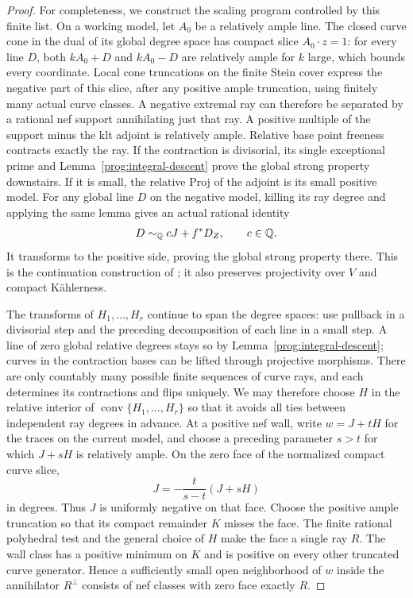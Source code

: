 \begin{proof}
For completeness, we construct the scaling program controlled by this
finite list. On a working model, let \(A_0\) be a relatively ample line.
The closed curve cone in the dual of its global degree space has compact
slice \(A_0\cdot z=1\): for every line \(D\), both \(kA_0+D\) and \(kA_0-D\)
are relatively ample for \(k\) large, which bounds every coordinate.
Local cone truncations on the finite Stein cover express the negative
part of this slice, after any positive ample truncation, using
finitely many actual curve classes.  A negative extremal ray can
therefore be separated by a rational nef support annihilating just
that ray.  A positive multiple of the support minus the klt adjoint
is relatively ample.  Relative base point freeness contracts exactly
the ray.  If the contraction is divisorial, its single exceptional
prime and Lemma~\ref{prog:integral-descent} prove the global strong
property downstairs.  If it is small, the relative Proj of the
adjoint is its small positive model.  For any global line \(D\) on
the negative model, killing its ray degree and applying the same
lemma gives an actual rational identity
\[
 D\sim_{\mathbb Q}cJ+f^*D_Z,\qquad c\in\mathbb Q.
\]
It transforms to the positive side, proving the global strong
property there.  This is the continuation construction of
\cite[Proposition~7.7]{CB}; it also preserves projectivity over \(V\)
and compact Kählerness.

The transforms of \(H_1,\ldots,H_r\) continue to span the degree spaces:
use pullback in a divisorial step and the preceding decomposition of
each line in a small step.  A line of zero global relative degrees
stays so by Lemma~\ref{prog:integral-descent}; curves in the
contraction bases can be lifted through projective morphisms.
There are only countably many possible finite sequences of curve rays,
and each determines its contractions and flips uniquely. We may therefore
choose \(H\) in the relative interior of
\(\operatorname{conv}\{H_1,\ldots,H_r\}\) so that it avoids all ties
between independent ray degrees in advance.
At a positive nef wall, write \(w=J+tH\) for the traces on the current
model, and choose a preceding parameter \(s>t\) for which \(J+sH\) is
relatively ample. On the zero face of the normalized compact curve slice,
\[
 J=-\frac{t}{s-t}(J+sH)
\]
in degrees. Thus \(J\) is uniformly negative on that face. Choose the
positive ample truncation so that its compact remainder \(K\) misses the
face. The finite rational polyhedral test and the general choice of \(H\)
make the face a single ray \(R\). The wall class has a positive minimum on
\(K\) and is positive on every other truncated curve generator. Hence a
sufficiently small open neighborhood of \(w\) inside the annihilator
\(R^\perp\) consists of nef classes with zero face exactly \(R\).


\end{proof}
